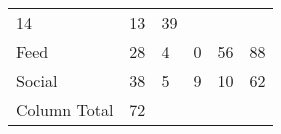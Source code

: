 \documentclass[]{book}
\begin{document}
\begin{longtable}[]{@{}llllll@{}}
\begin{minipage}[t]{0.14\columnwidth}
14\strut
\end{minipage} & \begin{minipage}[t]{0.12\columnwidth}\raggedright
13\strut
\end{minipage} & \begin{minipage}[t]{0.07\columnwidth}\raggedright
39\strut
\end{minipage}\tabularnewline
\begin{minipage}[t]{0.17\columnwidth}\raggedright
Feed\strut
\end{minipage} & \begin{minipage}[t]{0.12\columnwidth}\raggedright
28\strut
\end{minipage} & \begin{minipage}[t]{0.09\columnwidth}\raggedright
4\strut
\end{minipage} & \begin{minipage}[t]{0.14\columnwidth}\raggedright
0\strut
\end{minipage} & \begin{minipage}[t]{0.12\columnwidth}\raggedright
56\strut
\end{minipage} & \begin{minipage}[t]{0.07\columnwidth}\raggedright
88\strut
\end{minipage}\tabularnewline
\begin{minipage}[t]{0.17\columnwidth}\raggedright
Social\strut
\end{minipage} & \begin{minipage}[t]{0.12\columnwidth}\raggedright
38\strut
\end{minipage} & \begin{minipage}[t]{0.09\columnwidth}\raggedright
5\strut
\end{minipage} & \begin{minipage}[t]{0.14\columnwidth}\raggedright
9\strut
\end{minipage} & \begin{minipage}[t]{0.12\columnwidth}\raggedright
10\strut
\end{minipage} & \begin{minipage}[t]{0.07\columnwidth}\raggedright
62\strut
\end{minipage}\tabularnewline
\begin{minipage}[t]{0.17\columnwidth}\raggedright
Column Total\strut
\end{minipage} & \begin{minipage}[t]{0.12\columnwidth}\raggedright
72\strut
\end{minipage} & \begin{minipage}[t]{0.09\columnwidth}\raggedright

\end{minipage}
\end{longtable}
\end{document}
